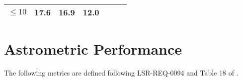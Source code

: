 \documentclass[DM, lsstdraft, toc]{lsstdoc}
\begin{document}
\begin{longtable}[]{@{}lllllll@{}}
\begin{minipage}[t]{0.14\columnwidth}
\(\leq 10\)\strut
\end{minipage} & \begin{minipage}[t]{0.12\columnwidth}\raggedright\strut
17.6\strut
\end{minipage} & \begin{minipage}[t]{0.12\columnwidth}\raggedright\strut
16.9\strut
\end{minipage} & \begin{minipage}[t]{0.12\columnwidth}\raggedright\strut
12.0\strut
\end{minipage} & \begin{minipage}[t]{0.17\columnwidth}\raggedright\strut
\strut
\end{minipage}\tabularnewline
\bottomrule
\end{longtable}

\section{Astrometric Performance}\label{astrometric-performance}

The following metrics are defined following LSR-REQ-0094
 and Table 18 of .
\end{document}
